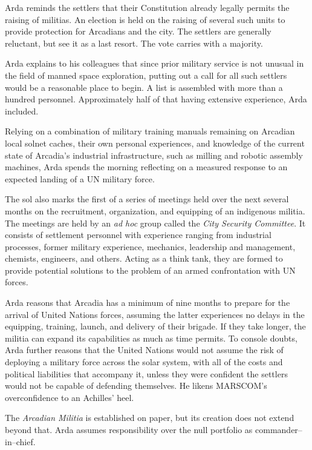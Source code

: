 Arda reminds the settlers that their Constitution already legally permits the raising of militias. An election is held on the raising of several such units to provide protection for  Arcadians and the city. The settlers are generally reluctant, but see it as a last resort. The vote carries with a majority.

Arda explains to his colleagues that since prior military service is not unusual in the field of manned space exploration, putting out a call for all such settlers would be a reasonable place to begin. A list is assembled with more than a hundred personnel. Approximately half of that having extensive experience, Arda included.
\StopTimelineDate

Relying on a combination of military training manuals remaining on Arcadian local solnet caches, their own personal experiences, and knowledge of the current state of Arcadia's industrial infrastructure, such as milling and robotic assembly machines, Arda spends the morning reflecting on a measured response to an expected landing of a UN military force. 

The sol also marks the first of a series of meetings held over the next several months on the recruitment, organization, and equipping of an indigenous militia. The meetings are held by an {\it ad hoc} group called the {\it City Security Committee}. It consists of settlement personnel with experience ranging from industrial processes, former military experience, mechanics, leadership and management, chemists, engineers, and others. Acting as a think tank, they are formed to provide potential solutions to the problem of an armed confrontation with UN forces.

Arda reasons that Arcadia has a minimum of nine months to prepare for the arrival of United Nations forces, assuming the latter experiences no delays in the equipping, training, launch, and delivery of their brigade. If they take longer, the militia can expand its capabilities as much as time permits. To console doubts, Arda further reasons that the United Nations would not assume the risk of deploying a military force across the solar system, with all of the costs and political liabilities that accompany it, unless they were confident the settlers would not be capable of defending themselves. He likens MARSCOM's overconfidence to an Achilles' heel.

The {\it Arcadian Militia} is established on paper, but its creation does not extend beyond that. Arda assumes responsibility over the null portfolio as commander--in--chief.
\StopTimelineDate

